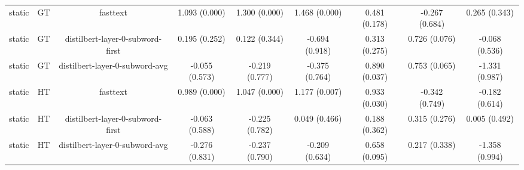 \begin{sidewaystable}[htb]
\begin{tabular}{@{}ccccccccc@{}}
        static & GT & fasttext & 1.093 (0.000) & 1.300 (0.000) & 1.468 (0.000) & 0.481 (0.178) & -0.267 (0.684) & 0.265 (0.343) \\
        static & GT & distilbert-layer-0-subword-first & 0.195 (0.252) & 0.122 (0.344) & -0.694 (0.918) & 0.313 (0.275) & 0.726 (0.076) & -0.068 (0.536) \\
        static & GT & distilbert-layer-0-subword-avg & -0.055 (0.573) & -0.219 (0.777) & -0.375 (0.764) & 0.890 (0.037) & 0.753 (0.065) & -1.331 (0.987) \\
        static & HT & fasttext & 0.989 (0.000) & 1.047 (0.000) & 1.177 (0.007) & 0.933 (0.030) & -0.342 (0.749) & -0.182 (0.614) \\
        static & HT & distilbert-layer-0-subword-first & -0.063 (0.588) & -0.225 (0.782) & 0.049 (0.466) & 0.188 (0.362) & 0.315 (0.276) & 0.005 (0.492) \\
        static & HT & distilbert-layer-0-subword-avg & -0.276 (0.831) & -0.237 (0.790) & -0.209 (0.634) & 0.658 (0.095) & 0.217 (0.338) & -1.358 (0.994) \\
        \bottomrule
    \end{tabular}
\end{sidewaystable}